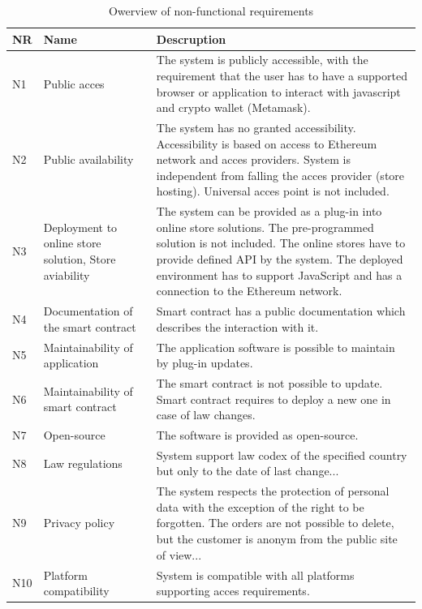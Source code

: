 \documentclass[thesis=M,english]{FITthesis}[2019/12/23]
\begin{document}
%


\begin{table}[ht!]
\caption{Owerview of non-functional requirements} \label{nonFunctional requirements}
\begin{tabular}{| p{0.5cm} | p{2.5cm} | p{10cm}|}
\toprule
NR &
  Name &
  Descruption \\ \midrule
N1 &
  Public acces &
  The system is publicly accessible, with the requirement that the user has to have a supported browser or application to interact with javascript and crypto wallet (Metamask). \\ \hline
N2 &
  Public availability &
  The system has no granted accessibility. Accessibility is based on access to Ethereum network and acces providers. System is independent from falling the acces provider (store hosting). Universal acces point is not included. \\ \hline
N3 &
  Deployment to online store solution, Store aviability &
  The system can be provided as a plug-in into online store solutions. The pre-programmed solution is not included. The online stores have to provide defined API by the system. The deployed environment has to support JavaScript and has a connection to the Ethereum network. \\ \hline
N4 &
  Documentation of the smart contract &
  Smart contract has a public documentation which describes the interaction with it. \\ \hline
N5 &
  Maintainability of application &
  The application software is possible to maintain by plug-in updates. \\ \hline
N6 &
  Maintainability of smart contract &
  The smart contract is not possible to update. Smart contract requires to deploy a new one in case of law changes. \\ \hline
N7 &
  Open-source &
  The software is provided as open-source. \\ \hline
N8 &
  Law regulations &
  System support law codex of the specified country but only to the date of last change... \\ \hline
N9 &
  Privacy policy &
  The system respects the protection of personal data with the exception of the right to be forgotten. The orders are not possible to delete, but the customer is anonym from the public site of view... \\ \hline
N10 &
  Platform compatibility &
  System is compatible with all platforms supporting acces requirements. \\ \hline

\end{tabular}
\end{table}
\end{document}
